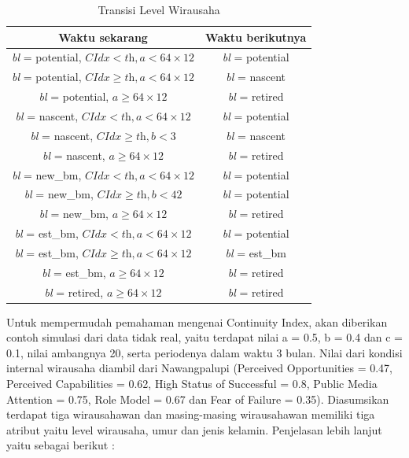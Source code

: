 \begin{table}[H]
\centering
\caption{Transisi Level Wirausaha}
\begin{tabular}{|c|c|}
\hline
Waktu sekarang & Waktu berikutnya \\
\hline
\textit{bl} = potential, $ \textit{CIdx} < \textit{th}, \textit{a} < 64 \times 12$ & \textit{bl} = potential \\
\hline
\textit{bl} = potential, $\textit{CIdx} \geq \textit{th}, \textit{a} < 64 \times 12$ & \textit{bl} = nascent \\
\hline
\textit{bl} = potential, $\textit{a} \geq 64 \times 12$ & \textit{bl} = retired \\
\hline
\textit{bl} = nascent, $\textit{CIdx} < \textit{th}, \textit{a} <64 \times 12$ & \textit{bl} = potential \\
\hline
\textit{bl} = nascent, $\textit{CIdx} \geq \textit{th}, \textit{b} < 3$ & \textit{bl} = nascent \\
\hline
\textit{bl} = nascent, $\textit{a} \geq 64 \times 12$ & \textit{bl} = retired \\
\hline
\textit{bl} = new\_bm, $\textit{CIdx} < \textit{th}, \textit{a} < 64 \times 12$ & \textit{bl} = potential \\
\hline
\textit{bl} = new\_bm, $\textit{CIdx} \geq \textit{th}, \textit{b} < 42$ & \textit{bl} = potential \\
\hline
\textit{bl} = new\_bm, $\textit{a} \geq 64 \times 12$ & \textit{bl} = retired \\
\hline
\textit{bl} = est\_bm, $\textit{CIdx} < \textit{th}, \textit{a} < 64 \times 12$ & \textit{bl} = potential \\
\hline
\textit{bl} = est\_bm, $\textit{CIdx} \geq \textit{th}, \textit{a} < 64 \times 12$ & \textit{bl} = est\_bm \\
\hline
\textit{bl} = est\_bm, $\textit{a} \geq 64 \times 12$ & \textit{bl} = retired \\
\hline
\textit{bl} = retired, $\textit{a} \geq 64 \times 12$ & \textit{bl} = retired \\
\hline
\end{tabular}
\label{tabelLW}
\end{table}


Untuk mempermudah pemahaman mengenai Continuity Index, akan diberikan contoh simulasi dari data tidak real, yaitu terdapat nilai a = 0.5, b = 0.4 dan c = 0.1, nilai ambangnya 20, serta periodenya dalam waktu 3 bulan. Nilai dari kondisi internal wirausaha diambil dari Nawangpalupi (Perceived Opportunities = 0.47, Perceived Capabilities = 0.62, High Status of Successful = 0.8, Public Media Attention = 0.75, Role Model = 0.67 dan Fear of Failure = 0.35). Diasumsikan terdapat tiga wirausahawan dan masing-masing wirausahawan memiliki tiga atribut yaitu level wirausaha, umur dan jenis kelamin. Penjelasan lebih lanjut yaitu sebagai berikut :
				
